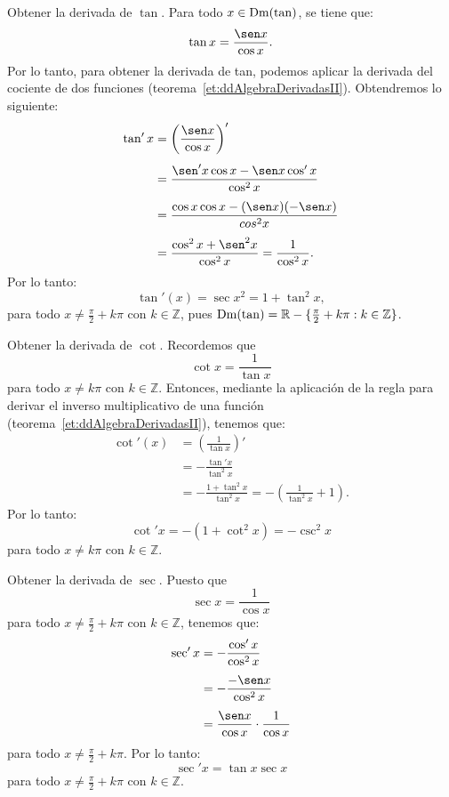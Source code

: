 \begin{exemplo}[Solución]{%
Obtener la derivada de $\tan$.
}%
Para todo $x\in\operatorname{Dm}(\tan)$, se tiene que:
\[
\tan x = \frac{\sen x}{\cos x}.
\]
Por lo tanto, para obtener la derivada de tan, podemos aplicar la derivada del cociente de dos
funciones (teorema~\ref{et:ddAlgebraDerivadasII}). Obtendremos lo siguiente:
\begin{align*}
\tan' x &= \left(\frac{\sen x}{\cos x}\right)' \\[4pt]
   &= \frac{\sen' x\cos x - \sen x\cos' x}{\cos^2 x} \\[4pt]
   &= \frac{\cos x \cos x - (\sen x)(-\sen x)}{cos^2 x} \\[4pt]
   &= \frac{\cos^2 x + \sen^2 x}{\cos^2 x} = \frac{1}{\cos^2 x}.
\end{align*}
Por lo tanto:
\[
\tan'(x) = \sec x^{2} = 1 + \tan^2 x,
\]
para todo $x \neq \frac{\pi}{2} + k\pi$ con $k\in\mathbb{Z}$, pues $\operatorname{Dm}(\tan) = \mathbb{R} -
\{\frac{\pi}{2} + k\pi : k\in\mathbb{Z}\}$.
\end{exemplo}

\begin{exemplo}[Solución]{%
Obtener la derivada de $\cot$.
}%
Recordemos que
\[
\cot x = \frac{1}{\tan x}
\]
para todo $x\neq k\pi$ con $k\in\mathbb{Z}$. Entonces, mediante la aplicación de la regla para
derivar el inverso multiplicativo de una función (teorema~\ref{et:ddAlgebraDerivadasII}), tenemos
que:
\begin{align*}
\cot'(x) &= \left(\frac{1}{\tan x}\right)' \\[4pt]
   &= -\frac{\tan' x}{\tan^2 x} \\[4pt]
   &= -\frac{1 + \tan^2 x}{\tan^2 x} = -\left(\frac{1}{\tan^2 x} + 1\right).
\end{align*}
Por lo tanto:
\[
\cot' x = -(1 + \cot^2 x) = -\csc^2 x
\]
para todo $x\neq k\pi$ con $k\in\mathbb{Z}$.
\end{exemplo}

\begin{exemplo}[Solución]{%
Obtener la derivada de $\sec$.
}%
Puesto que
\[
\sec x = \frac{1}{\cos x}
\]
para todo $x \neq \frac{\pi}{2} + k\pi$ con $k\in\mathbb{Z}$, tenemos que:
\begin{align*}
\sec' x &= -\frac{\cos' x}{\cos^2 x} \\[4pt]
   &= -\frac{-\sen x}{\cos^2 x} \\[4pt]
   &= \frac{\sen x}{\cos x}\cdot\frac{1}{\cos x}
\end{align*}
para todo $x \neq \frac{\pi}{2} + k\pi$. Por lo tanto:
\[
\sec' x  = \tan x \sec x
\]
para todo $x \neq \frac{\pi}{2} + k\pi$ con $k\in\mathbb{Z}$.
\end{exemplo}


